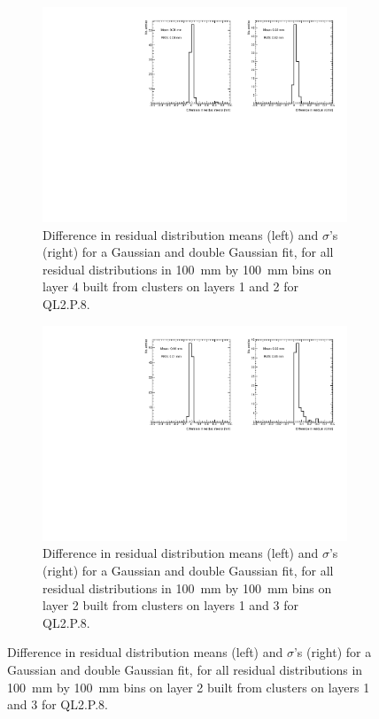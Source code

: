 \newpage
\thispagestyle{empty}
\begin{figure}
\centering
 \begin{subfigure}{\textwidth}
    \includegraphics[width = \linewidth]{figures/figure_compare_residual_fits_QL2P08_3100V_2021-06-18_no_dnl_minus_QL2P08_3100V_2021-07-19_doub_gaus_log_scale_layer4_fixedlayers12.pdf} 
    \caption{Difference in residual distribution means (left) and $\sigma$'s (right) for a Gaussian and double Gaussian fit, for all residual distributions in \SI{100}{\milli\meter} by \SI{100}{\milli\meter} bins on layer 4 built from clusters on layers 1 and 2 for QL2.P.8.}
    \label{fig:double_Gaussian_compare_fits_L4_F12}
  \end{subfigure}
\vspace*{\floatsep}
 
 \begin{subfigure}{\textwidth}
    \includegraphics[width = \linewidth]{figures/figure_compare_residual_fits_QL2P08_3100V_2021-06-18_no_dnl_minus_QL2P08_3100V_2021-07-19_doub_gaus_log_scale_layer2_fixedlayers13.pdf} 
    \caption{Difference in residual distribution means (left) and $\sigma$'s (right) for a Gaussian and double Gaussian fit, for all residual distributions in \SI{100}{\milli\meter} by \SI{100}{\milli\meter} bins on layer 2 built from clusters on layers 1 and 3 for QL2.P.8.}
    \label{fig:double_Gaussian_compare_fits_L2_F13}
  \end{subfigure}
  

\end{figure}
